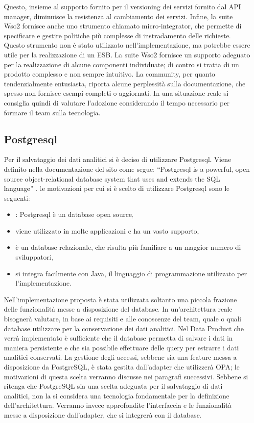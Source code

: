 \documentclass[12pt]{report}
\begin{document}
Questo, insieme al supporto fornito per il versioning dei servizi fornito dal API manager, diminuisce la resistenza al cambiamento dei servizi. 
Infine, la suite Wso2 fornisce anche uno strumento chiamato micro-integrator, che permette di specificare e gestire politiche più complesse di instradamento delle richieste.
Questo strumento non è stato utilizzato nell'implementazione, ma potrebbe essere utile per la realizzazione di un ESB.
La suite Wso2 fornisce un supporto adeguato per la realizzazione di alcune componenti individuate; di contro si tratta di un prodotto complesso e non sempre intuitivo.
La community, per quanto tendenzialmente entusiasta, riporta alcune perplessità sulla documentazione, che spesso non fornisce esempi completi o aggiornati.
In una situazione reale si consiglia quindi di valutare l'adozione considerando il tempo necessario per formare il team sulla tecnologia.

\subsection{Postgresql}
Per il salvataggio dei dati analitici si è deciso di utilizzare Postgresql.
Viene definito nella documentazione del sito come segue: ``Postgresql is a powerful, open source object-relational database system that uses and extends the SQL language'' \cite{noauthor_postgresql_nodate}.
le motivazioni per cui si è scelto di utilizzare Postgresql sono le seguenti:
\begin{itemize}
    \item: Postgresql è un database open source,
    \item viene utilizzato in molte applicazioni e ha un vasto supporto,
    \item è un database relazionale, che risulta più familiare a un maggior numero di sviluppatori,
    \item si integra facilmente con Java, il linguaggio di programmazione utilizzato per l'implementazione.
\end{itemize}
Nell'implementazione proposta è stata utilizzata soltanto una piccola frazione delle funzionalità messe a disposizione del database.
In un'architettura reale bisognerà valutare, in base ai requisiti e alle conoscenze del team, quale o quali database utilizzare per la conservazione dei dati analitici.
Nel Data Product che verrà implementato è sufficiente che il database permetta di salvare i dati in maniera persistente e che sia possibile effettuare delle query per estrarre i dati analitici conservati. 
La gestione degli accessi, sebbene sia una feature messa a disposizione da PostgreSQL, è stata gestita dall'adapter che utilizzerà OPA; le motivazioni di questa scelta verranno discusse nei paragrafi successivi.
Sebbene si ritenga che PostgreSQL sia una scelta adeguata per il salvataggio di dati analitici, non la si considera una tecnologia fondamentale per la definizione dell'architettura.
Verranno invece approfondite l'interfaccia e le funzionalità messe a disposizione dall'adapter, che si integrerà con il database.
\end{document}
